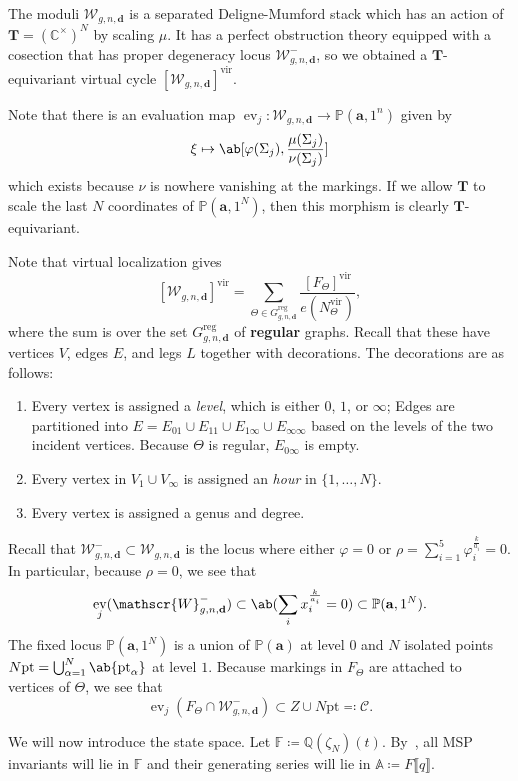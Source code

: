 \documentclass[10pt]{amsart}
\theoremstyle{definition}
\theoremstyle{remark}
\theoremstyle{plain}
\theoremstyle{definition}
\theoremstyle{remark}
\newcommand{\A}{\mathbb{A}}
\newcommand{\C}{\mathbb{C}}
\newcommand{\Q}{\mathbb{Q}}
\newcommand{\F}{\mathbb{F}}
\newcommand{\W}{\mathcal{W}}
\newcommand{\bd}{\mathbf{d}}
\newcommand{\ba}{\mathbf{a}}
\renewcommand{\P}{\mathbb{P}}
\newcommand{\mc}[1]{\mathcal{#1}}
\newcommand{\msc}[1]{\mathscr{#1}}
\newcommand{\T}{\mathbf{T}}
\newcommand{\mbf}[1]{\mathbf{#1}}
\newcommand{\mr}[1]{\mathrm{#1}}
\newcommand{\1}{\mathbf{1}}
\newcommand{\2}{\mathbf{2}}
\newcommand{\3}{\mathbf{3}}
\newcommand{\vir}{\mr{vir}}
\newcommand{\pt}{\mr{pt}}
\DeclareMathOperator{\ev}{ev}
\numberwithin{equation}{section}
\begin{document}
The moduli $\msc{W}_{g,n,\mbf{d}}$ is a separated Deligne-Mumford stack which has an action of $\T = (\C^{\times})^N$ by scaling $\mu$. It has a perfect obstruction theory equipped with a cosection that has proper degeneracy locus $\msc{W}_{g,n,\mbf{d}}^-$, so we obtained a $\T$-equivariant virtual cycle $[\msc{W}_{g,n,\mbf{d}}]^{\vir}$.

Note that there is an evaluation map $\ev_j \colon \msc{W}_{g,n,\mbf{d}} \to \P(\mbf{a}, 1^n)$ given by
\[ \xi \mapsto \ab[\varphi(\Sigma_j), \frac{\mu(\Sigma_j)}{\nu(\Sigma_j)}] \]
which exists because $\nu$ is nowhere vanishing at the markings. If we allow $\T$ to scale the last $N$ coordinates of $\P(\mbf{a}, 1^N)$, then this morphism is clearly $\T$-equivariant.

Note that virtual localization gives
\[ [\msc{W}_{g,n,\bd}]^{\vir} = \sum_{\Theta \in G_{g,n,\bd}^{\mr{reg}}} \frac{[F_{\Theta}]^{\vir}}{e(N_{\Theta}^{\vir})}, \]
where the sum is over the set $G_{g,n,\bd}^{\mr{reg}}$ of \textbf{regular} graphs. Recall that these have vertices $V$, edges $E$, and legs $L$ together with decorations. The decorations are as follows:
\begin{enumerate}
    \item Every vertex is assigned a \textit{level}, which is either $0$, $1$, or $\infty$; Edges are partitioned into $E = E_{01} \cup E_{11} \cup E_{1\infty} \cup E_{\infty\infty}$ based on the levels of the two incident vertices. Because $\Theta$ is regular, $E_{0\infty}$ is empty.
    \item Every vertex in $V_1 \cup V_{\infty}$ is assigned an \textit{hour} in $\{1, \ldots, N\}$.
    \item Every vertex is assigned a genus and degree.
\end{enumerate}

Recall that $\msc{W}_{g,n,\bd}^- \subset \msc{W}_{g,n,\bd}$ is the locus where either $\varphi = 0$ or $\rho = \sum_{i=1}^5 \varphi_i^{\frac{k}{a_i}} = 0$. In particular, because $\rho = 0$, we see that
\[ \ev_j(\msc{W}_{g,n,\bd}^-) \subset \ab(\sum_i x_i^{\frac{k}{a_i}} = 0) \subset \P(\ba, 1^N). \]
The fixed locus $\P(\ba, 1^N)$ is a union of $\P(\ba)$ at level $0$ and $N$ isolated points $N\pt = \bigcup_{\alpha=1}^N \ab\{\pt_{\alpha}\}$ at level $1$. Because markings in $F_{\Theta}$ are attached to vertices of $\Theta$, we see that
\[ \ev_j(F_{\Theta} \cap \W_{g,n,\bd}^-) \subset Z \cup N\pt \eqqcolon \mc{C}. \]

We will now introduce the state space. Let $\F \coloneqq \Q(\zeta_N)(t)$. By~, all MSP invariants will lie in $\F$ and their generating series will lie in $\A \coloneqq F\llbracket q \rrbracket$.
\end{document}
